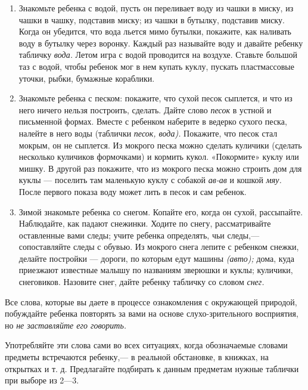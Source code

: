 \documentclass{book}
\renewcommand{\emph}[1]{\textit{#1}}
\begin{document}
\begin{enumerate}
\def\labelenumi{\arabic{enumi}.}
\setcounter{enumi}{4}
\item
  
  Знакомьте ребенка с водой, пусть он переливает воду из чашки в миску,
  из чашки в чашку, подставив миску; из чашки в бутылку, подставив
  миску. Когда он убедится, что вода льется мимо бутылки, покажите, как
  наливать воду в бутылку через воронку. Каждый раз называйте воду и
  давайте ребенку табличку \emph{вода.} Летом игра с водой проводится на
  воздухе. Ставьте большой таз с водой, чтобы ребенок мог в нем купать
  куклу, пускать пластмассовые уточки, рыбки, бумажные кораблики.
  
\item
  
  Знакомьте ребенка с песком: покажите, что сухой песок сыплется, и что
  из него ничего нельзя построить, сделать. Дайте слово \emph{песок} в
  устной и письменной формах. Вместе с ребенком наберите в ведерко
  сухого песка, налейте в него воды (таблички \emph{песок, вода).}
  Покажите, что песок стал мокрым, он не сыплется. Из мокрого песка
  можно сделать куличики (сделать несколько куличиков формочками) и
  кормить кукол. «Покормите» куклу или мишку. В другой раз покажите, что
  из мокрого песка можно строить дом для куклы --- поселить там
  маленькую куклу с собакой \emph{ав-ав} и кошкой \emph{мяу.} После
  первого показа воду может лить в песок и сам ребенок.
  
\item
  
  Зимой знакомьте ребенка со снегом. Копайте его, когда он сухой,
  рассыпайте. Наблюдайте, как падают снежинки. Ходите по снегу,
  рассматривайте оставленные вами следы; учите ребенка определять, чьи
  следы,--- сопоставляйте следы с обувью. Из мокрого снега лепите с
  ребенком снежки, делайте постройки --- дороги, по которым едут машины
  \emph{(авто);} дома, куда приезжают известные малышу по названиям
  зверюшки и куклы; куличики, снеговиков. Назовите снег, дайте ребенку
  табличку со словом \emph{снег.}
  
\end{enumerate}


Все слова, которые вы даете в процессе ознакомления с окружающей
природой, побуждайте ребенка повторять за вами на основе
слухо-зрительного восприятия, но \emph{не заставляйте его говорить.}

Употребляйте эти слова сами во всех ситуациях, когда обозначаемые
словами предметы встречаются ребенку,--- в реальной обстановке, в
книжках, на открытках и т. д. Предлагайте подбирать к данным предметам
нужные таблички при выборе из 2---3.
\end{document}
